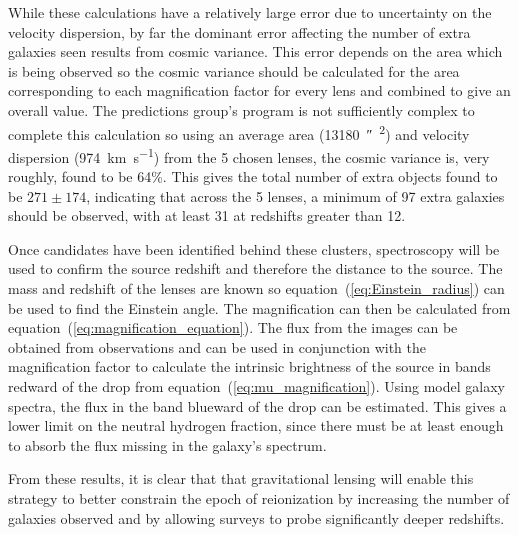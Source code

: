 		While these calculations have a relatively large error due to uncertainty on the velocity dispersion, by far the dominant error affecting the number of extra galaxies seen results from cosmic variance. This error depends on the area which is being observed so the cosmic variance should be calculated for the area corresponding to each magnification factor for every lens and combined to give an overall value. The predictions group's program is not sufficiently complex to complete this calculation so using an average area (\SI{13180}{\arcsecond{}^2}) and velocity dispersion (\SI{974}{\kilo\metre\per\second}) from the 5 chosen lenses, the cosmic variance is, very roughly, found to be 64\%. This gives the total number of extra objects found to be $271\pm 174$, indicating that across the 5 lenses, a minimum of 97 extra galaxies should be observed, with at least 31 at redshifts greater than 12.

		Once candidates have been identified behind these clusters, spectroscopy will be used to confirm the source redshift and therefore the distance to the source. The mass and redshift of the lenses are known so equation~(\ref{eq:Einstein_radius}) can be used to find the Einstein angle. The magnification can then be calculated from equation~(\ref{eq:magnification_equation}). The flux from the images can be obtained from observations and can be used in conjunction with the magnification factor to calculate the intrinsic brightness of the source in bands redward of the drop from equation~(\ref{eq:mu_magnification}). Using model galaxy spectra, the flux in the band blueward of the drop can be estimated. This gives a lower limit on the neutral hydrogen fraction, since there must be at least enough to absorb the flux missing in the galaxy's spectrum\cite{lower_limit_H}.

		From these results, it is clear that that gravitational lensing will enable this strategy to better constrain the epoch of reionization by increasing the number of galaxies observed and by allowing surveys to probe significantly deeper redshifts.
